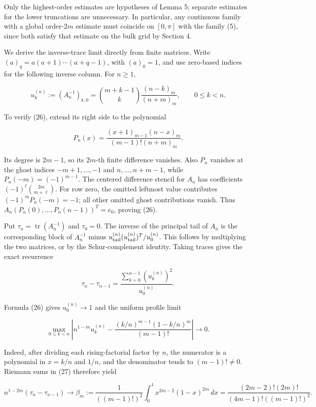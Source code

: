 \documentclass[10pt,a4paper]{article}
\begin{document}
Only the highest-order estimates are hypotheses of Lemma 5; separate estimates for the lower truncations are unnecessary. In particular, any continuous family with a global order-\(2m\) estimate must coincide on \([0,\pi]\) with the family (5), since both satisfy that estimate on the bulk grid by Section 4.

We derive the inverse-trace limit directly from finite matrices. Write \((a)_q=a(a+1)\cdots(a+q-1)\), with \((a)_0=1\), and use zero-based indices for the following inverse column. For \(n\ge1\),

\nopagebreak[3]
\[
u_k^{(n)}:=(A_n^{-1})_{k,0}
=\binom{m+k-1}{k}\frac{(n-k)_m}{(n+m)_m},
\qquad 0\le k<n.
\tag{26}
\]

To verify (26), extend its right side to the polynomial

\nopagebreak[3]
\[
P_n(x)=\frac{(x+1)_{m-1}(n-x)_m}{(m-1)!(n+m)_m}.
\]

Its degree is \(2m-1\), so its \(2m\)-th finite difference vanishes. Also \(P_n\) vanishes at the ghost indices \(-m+1,\ldots,-1\) and \(n,\ldots,n+m-1\), while \(P_n(-m)=(-1)^{m-1}\). The centered difference stencil for \(A_n\) has coefficients \((-1)^\ell\binom{2m}{m+\ell}\). For row zero, the omitted leftmost value contributes \((-1)^mP_n(-m)=-1\); all other omitted ghost contributions vanish. Thus \(A_n(P_n(0),\ldots,P_n(n-1))^T=e_0\), proving (26).

Put \(\tau_n=\operatorname{tr}(A_n^{-1})\) and \(\tau_0=0\). The inverse of the principal tail of \(A_n\) is the corresponding block of \(A_n^{-1}\) minus \(u_{\rm tail}^{(n)}(u_{\rm tail}^{(n)})^T/u_0^{(n)}\). This follows by multiplying the two matrices, or by the Schur-complement identity. Taking traces gives the exact recurrence

\nopagebreak[3]
\[
\tau_n-\tau_{n-1}
=\frac{\sum_{k=0}^{n-1}(u_k^{(n)})^2}{u_0^{(n)}}.
\tag{27}
\]

Formula (26) gives \(u_0^{(n)}\to1\) and the uniform profile limit

\nopagebreak[3]
\[
\max_{0\le k<n}\left|n^{1-m}u_k^{(n)}-
\frac{(k/n)^{m-1}(1-k/n)^m}{(m-1)!}\right|\longrightarrow0.
\]

Indeed, after dividing each rising-factorial factor by \(n\), the numerator is a polynomial in \(x=k/n\) and \(1/n\), and the denominator tends to \((m-1)!\ne0\). Riemann sums in (27) therefore yield

\nopagebreak[3]
\[
n^{1-2m}(\tau_n-\tau_{n-1})\longrightarrow
\beta_m:=\frac{1}{((m-1)!)^2}
\int_0^1x^{2m-2}(1-x)^{2m}\,dx
=\frac{(2m-2)!(2m)!}{(4m-1)!((m-1)!)^2}.
\tag{28}
\]
\end{document}
